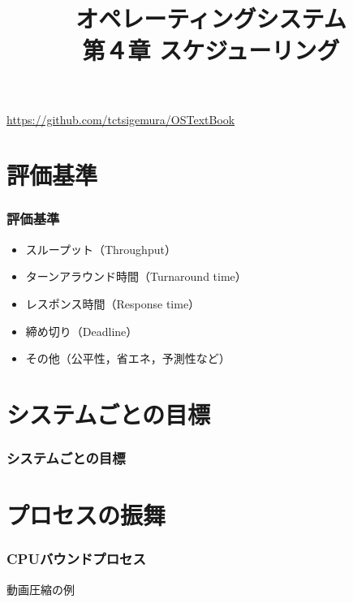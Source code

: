 \documentclass[unicode,handout]{beamer}                   %
\begin{document}
\title[スケジューリング]
      {オペレーティングシステム\\第４章 スケジューリング}
\date{}
\begin{frame}
  \titlepage
  \centerline{\url{https://github.com/tctsigemura/OSTextBook}}
\end{frame}


\section{評価基準}
\begin{frame}
  \frametitle{評価基準}
  \begin{itemize}
    \item スループット（Throughput）
    \item ターンアラウンド時間（Turnaround time）
    \item レスポンス時間（Response time）
    \item 締め切り（Deadline）
    \item その他（公平性，省エネ，予測性など）
  \end{itemize}
\end{frame}

\section{システムごとの目標}
\begin{frame}
  \frametitle{システムごとの目標}
\end{frame}

\section{プロセスの振舞}
\begin{frame}
  \frametitle{CPUバウンドプロセス}
  動画圧縮の例\\
  \vfill
  \vfill
\end{frame}
\end{document}
